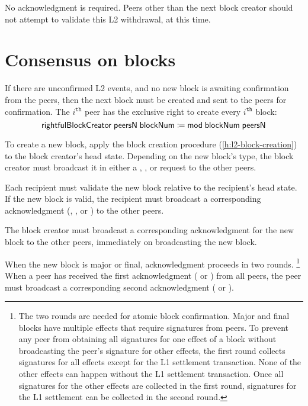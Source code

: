 \documentclass[../hydrozoa.tex]{subfiles}
\begin{document}
No acknowledgment is required.
Peers other than the next block creator should not attempt to validate this L2 withdrawal, at this time.

\section{Consensus on blocks}%
\label{h:l2-consensus-on-blocks}%

If there are unconfirmed L2 events, and no new block is awaiting confirmation from the peers, then the next block must be created and sent to the peers for confirmation.
The $i^\mathtt{th}$ peer has the exclusive right to create every $i^\mathtt{th}$ block: 
\begin{equation*}
  \mathsf{rightfulBlockCreator} \; \mathsf{peersN} \; \mathsf{blockNum} \coloneq
    \mathsf{mod} \; \mathsf{blockNum} \; \mathsf{peersN}
\end{equation*}

To create a new block, apply the block creation procedure (\cref{h:l2-block-creation}) to the block creator's head state.
Depending on the new block's type, the block creator must broadcast it in either a , , or  request to the other peers.

Each recipient must validate the new block relative to the recipient's head state.
If the new block is valid, the recipient must broadcast a corresponding acknowledgment (, , or ) to the other peers.

The block creator must broadcast a corresponding acknowledgment for the new block to the other peers, immediately on broadcasting the new block.

When the new block is major or final, acknowledgment proceeds in two rounds.%
\footnote{The two rounds are needed for atomic block confirmation.
  Major and final blocks have multiple effects that require signatures from peers.
  To prevent any peer from obtaining all signatures for one effect of a block without broadcasting the peer's signature for other effects, the first round collects signatures for all effects except for the L1 settlement transaction.
  None of the other effects can happen without the L1 settlement transaction.
  Once all signatures for the other effects are collected in the first round, signatures for the L1 settlement can be collected in the second round.
  }
When a peer has received the first acknowledgment ( or ) from all peers, the peer must broadcast a corresponding second acknowledgment ( or ).
\end{document}
